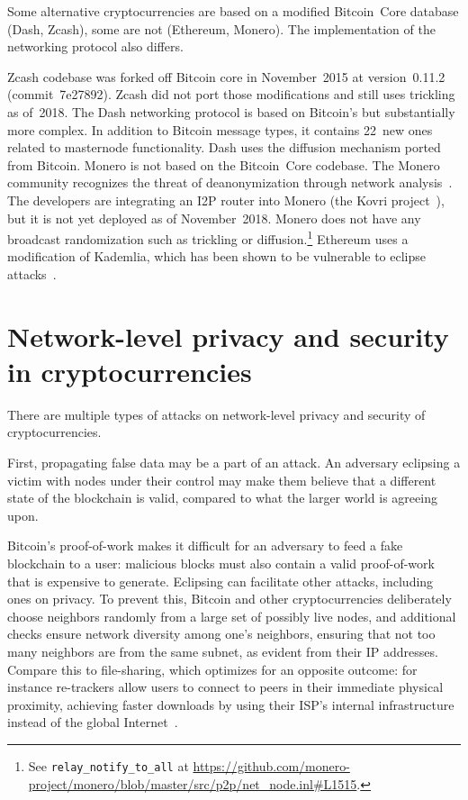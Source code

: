 Some alternative cryptocurrencies are based on a modified Bitcoin~Core database (Dash, Zcash), some are not (Ethereum, Monero).
The implementation of the networking protocol also differs.

Zcash codebase was forked off Bitcoin core in November~2015 at version~0.11.2 (commit~7e27892).
Zcash did not port those modifications and still uses trickling as of~2018.
The Dash networking protocol is based on Bitcoin's but substantially more complex.
In addition to Bitcoin message types, it contains 22~new ones related to masternode functionality.
Dash uses the diffusion mechanism ported from Bitcoin.
Monero is not based on the Bitcoin~Core codebase.
The Monero community recognizes the threat of deanonymization through network analysis~\cite{user36432017, manontheinside2016, expez2016, Cameron2016}.
The developers are integrating an I2P router into Monero (the Kovri project~\cite{Kovri}), but it is not yet deployed as of November~2018.
Monero does not have any broadcast randomization such as trickling or diffusion.\footnote{See \texttt{relay\_notify\_to\_all} at \url{https://github.com/monero-project/monero/blob/master/src/p2p/net\_node.inl\#L1515}.}%
Ethereum uses a modification of Kademlia, which has been shown to be vulnerable to eclipse attacks~\cite{Henningsen2019,Marcus2018}.


\section{Network-level privacy and security in cryptocurrencies}

There are multiple types of attacks on network-level privacy and security of cryptocurrencies.

First, propagating false data may be a part of an attack.
An adversary eclipsing a victim with nodes under their control may make them believe that a different state of the blockchain is valid, compared to what the larger world is agreeing upon.

Bitcoin's proof-of-work makes it difficult for an adversary to feed a fake blockchain to a user: malicious blocks must also contain a valid proof-of-work that is expensive to generate.
Eclipsing can facilitate other attacks, including ones on privacy.
To prevent this, Bitcoin and other cryptocurrencies deliberately choose neighbors randomly from a large set of possibly live nodes, and additional checks ensure network diversity among one's neighbors, ensuring that not too many neighbors are from the same subnet, as evident from their IP addresses.
Compare this to file-sharing, which optimizes for an opposite outcome: for instance re-trackers allow users to connect to peers in their immediate physical proximity, achieving faster downloads by using their ISP's internal infrastructure instead of the global Internet~\cite{Yoshida2012,Wang2012}.

